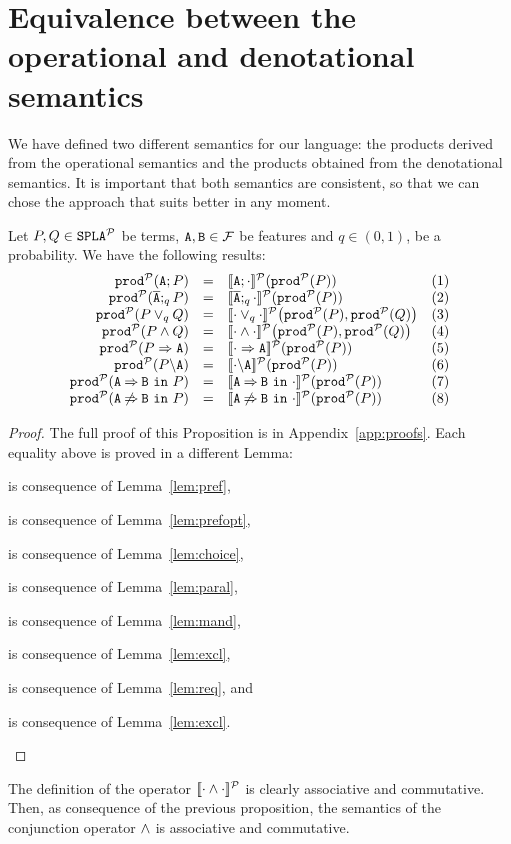 \section{Equivalence between the operational and denotational semantics}\label{sec:equivalenceMain}
We have defined two different semantics for our language:
the products derived from the operational semantics and the products
obtained from the denotational semantics. It is important that
both semantics are consistent, so that we can chose the approach that suits
better in any moment.

\bprop\label{prop:DenoOpe}
  Let $P,Q\in\mathtt{SPLA{^{\cal P}}}$ be terms, $\mathtt{A},\mathtt{B}\in{\cal F}$ be features and $q\in (0,1)$, be a probability. We have the following results:
  $$
  \setcounter{enumi}{0}
  \begin{array}{rlll<{\stepcounter{enumi}(\arabic{enumi})}}
  \prodp(\feature{A};P)&=&\semdenp{\feature{A};\cdot}(\prodp(P)) &\\
  \prodp(\ofeature{A};_qP)&=&\semdenp{\ofeature{A};_q\cdot}(\prodp(P))& \\
  \prodp(P\choice_q Q)&=&\semdenp{\cdot\choice_q\cdot}\bigl(\prodp(P),\prodp(Q)\bigr)& \\
  \prodp(P\paral Q)&=&\semdenp{\cdot\paral\cdot}\bigl(\prodp(P),\prodp(Q)\bigr)& \\
  \prodp(\mandatory{A}{P})&=&\semdenp{\mandatory{A}{\cdot}}(\prodp(P))& \\
  \prodp(\forbid{A}{P})&=&\semdenp{\forbid{A}{\cdot}}(\prodp(P))& \\
  \prodp(\require{A}{B}{P})&=&\semdenp{\require{A}{B}{\cdot}}(\prodp(P))& \\
  \prodp(\exclude{A}{B}{P})&=&\semdenp{\exclude{A}{B}{\cdot}}(\prodp(P)) &
    \end{array}$$
    \begin{proof}
      The full proof of this Proposition is in
      Appendix~\ref{app:proofs}. Each equality above
      is proved in a different Lemma:
      \begin{enumerate*}[label=(\arabic{enumi})]
      \item is consequence of Lemma~\ref{lem:pref},
      \item is
        consequence of Lemma~\ref{lem:prefopt},
      \item is consequence of
        Lemma~\ref{lem:choice},
      \item is consequence of
        Lemma~\ref{lem:paral},
      \item  is consequence of
        Lemma~\ref{lem:mand},
      \item is consequence of
        Lemma~\ref{lem:excl},
      \item is consequence of
        Lemma~\ref{lem:req}, and
      \item is consequence of
        Lemma~\ref{lem:excl}.
      \end{enumerate*}
    \end{proof}
\eprop
The definition of the operator \([\![\cdot\mathbin{\wedge}\cdot]\!]^{\cal P}\) is
clearly associative and commutative. Then, as consequence of the
previous proposition, the semantics of the
conjunction operator $\mathbin{\wedge}$ is associative and commutative.

